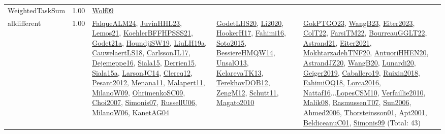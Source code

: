 {\begin{longtable}{p{3cm}r>{\raggedright\arraybackslash}p{6cm}>{\raggedright\arraybackslash}p{6cm}>{\raggedright\arraybackslash}p{8cm}}
\index{WeightedTaskSum}\index{Constraints!WeightedTaskSum}WeightedTaskSum &  1.00 & \hyperref[detail:Wolf09]{Wolf09} &  & \\
\index{alldifferent}\index{Constraints!alldifferent}alldifferent &  1.00 & \hyperref[detail:FalqueALM24]{FalqueALM24}, \hyperref[detail:JuvinHHL23]{JuvinHHL23}, \hyperref[detail:Lemos21]{Lemos21}, \hyperref[detail:KoehlerBFFHPSSS21]{KoehlerBFFHPSSS21}, \hyperref[detail:Godet21a]{Godet21a}, \hyperref[detail:HoundjiSW19]{HoundjiSW19}, \hyperref[detail:LiuLH19a]{LiuLH19a}, \hyperref[detail:CauwelaertLS18]{CauwelaertLS18}, \hyperref[detail:CarlssonJL17]{CarlssonJL17}, \hyperref[detail:Dejemeppe16]{Dejemeppe16}, \hyperref[detail:Siala15]{Siala15}, \hyperref[detail:Derrien15]{Derrien15}, \hyperref[detail:Siala15a]{Siala15a}, \hyperref[detail:LarsonJC14]{LarsonJC14}, \hyperref[detail:Clercq12]{Clercq12}, \hyperref[detail:Pesant2012]{Pesant2012}, \hyperref[detail:Menana11]{Menana11}, \hyperref[detail:Malapert11]{Malapert11}, \hyperref[detail:MilanoW09]{MilanoW09}, \hyperref[detail:OhrimenkoSC09]{OhrimenkoSC09}, \hyperref[detail:Choi2007]{Choi2007}, \hyperref[detail:Simonis07]{Simonis07}, \hyperref[detail:RussellU06]{RussellU06}, \hyperref[detail:MilanoW06]{MilanoW06}, \hyperref[detail:KanetAG04]{KanetAG04} & \hyperref[detail:GodetLHS20]{GodetLHS20}, \hyperref[detail:Li2020]{Li2020}, \hyperref[detail:HookerH17]{HookerH17}, \hyperref[detail:Fahimi16]{Fahimi16}, \hyperref[detail:Soto2015]{Soto2015}, \hyperref[detail:BessiereHMQW14]{BessiereHMQW14}, \hyperref[detail:UnsalO13]{UnsalO13}, \hyperref[detail:KelarevaTK13]{KelarevaTK13}, \hyperref[detail:TerekhovDOB12]{TerekhovDOB12}, \hyperref[detail:ZengM12]{ZengM12}, \hyperref[detail:Schutt11]{Schutt11}, \hyperref[detail:Magato2010]{Magato2010} & \hyperref[detail:GokPTGO23]{GokPTGO23}, \hyperref[detail:WangB23]{WangB23}, \hyperref[detail:Eiter2023]{Eiter2023}, \hyperref[detail:ColT22]{ColT22}, \hyperref[detail:FarsiTM22]{FarsiTM22}, \hyperref[detail:BourreauGGLT22]{BourreauGGLT22}, \hyperref[detail:Astrand21]{Astrand21}, \hyperref[detail:Eiter2021]{Eiter2021}, \hyperref[detail:MokhtarzadehTNF20]{MokhtarzadehTNF20}, \hyperref[detail:AntuoriHHEN20]{AntuoriHHEN20}, \hyperref[detail:AstrandJZ20]{AstrandJZ20}, \hyperref[detail:WangB20]{WangB20}, \hyperref[detail:Lunardi20]{Lunardi20}, \hyperref[detail:Geiger2019]{Geiger2019}, \hyperref[detail:Caballero19]{Caballero19}, \hyperref[detail:Ruixin2018]{Ruixin2018}, \hyperref[detail:FahimiOQ18]{FahimiOQ18}, \hyperref[detail:Lorca2016]{Lorca2016}, \hyperref[detail:Nattaf16]{Nattaf16}...\hyperref[detail:LopesCSM10]{LopesCSM10}, \hyperref[detail:Verfaillie2010]{Verfaillie2010}, \hyperref[detail:Malik08]{Malik08}, \hyperref[detail:RasmussenT07]{RasmussenT07}, \hyperref[detail:Sun2006]{Sun2006}, \hyperref[detail:Ahmed2006]{Ahmed2006}, \hyperref[detail:Thorsteinsson01]{Thorsteinsson01}, \hyperref[detail:Apt2001]{Apt2001}, \hyperref[detail:BeldiceanuC01]{BeldiceanuC01}, \hyperref[detail:Simonis99]{Simonis99} (Total: 43)\\

\end{longtable}}
